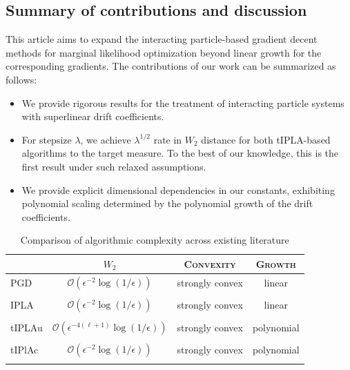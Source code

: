 \documentclass[a4paper, 10pt]{article}
\theoremstyle{plain}%
\begin{document}
\subsection{Summary of contributions and discussion}\label{summary}
This article aims to expand the interacting particle-based gradient decent methods for marginal likelihood optimization beyond linear growth for the corresponding gradients. The contributions of our work can be summarized as follows:
\begin{itemize}
  \item We provide rigorous results for the treatment of interacting particle systems with superlinear drift coefficients.
  \item For stepsize $\lambda$, we achieve $\lambda^{1/2}$ rate in $W_2$ distance for both tIPLA-based algorithms to the target measure. To the best of our knowledge, this is the first result under such relaxed assumptions.
  \item We provide explicit dimensional dependencies in our constants, exhibiting polynomial scaling determined by the polynomial growth of the drift coefficients.
\end{itemize}
\begin{table}[h]
\caption{Comparison of algorithmic complexity across existing literature}
\label{table}
\centering
\begin{tabular}{lccc}
\toprule
    &$W_2$
    &\textsc{Convexity}
	&\textsc{Growth}
    \\
\midrule
    PGD \cite{Kuntz} 
	&$\mathcal{O}\left(\epsilon^{-2}\log(1/\epsilon)\right)$
    &strongly convex
	&linear
	\\
	\\
    IPLA \cite{Ipla}
	&$\mathcal{O}\left(\epsilon^{-2}\log(1/\epsilon)\right)$
    &strongly convex
	&linear
	\\
	\\
    tIPLAu
    &$\mathcal{O}\left(\epsilon^{-4(\ell+1)}\log(1/\epsilon)\right)$
    &strongly convex
	&polynomial
	\\
	\\
    tIPlAc
	&$\mathcal{O}\left(\epsilon^{-2}\log(1/\epsilon)\right)$
    &strongly convex
	&polynomial
	\\
	\\
\bottomrule
\end{tabular}
\end{table}
\end{document}
